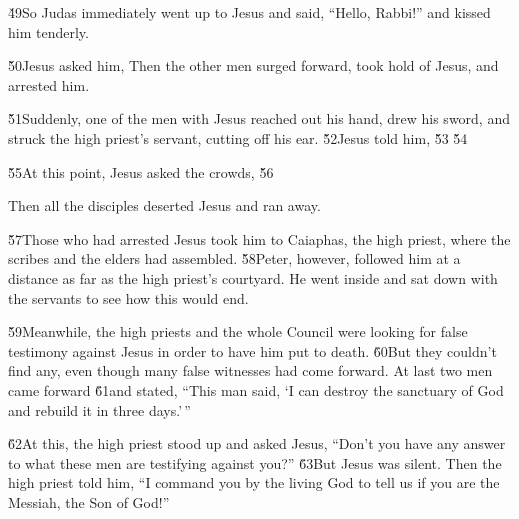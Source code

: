 \v{49}So Judas immediately went up to Jesus and said, ``Hello, Rabbi!'' and kissed him tenderly.

\v{50}Jesus asked him,  Then the other men surged forward, took hold of Jesus, and arrested him.

\v{51}Suddenly, one of the men with Jesus reached out his hand, drew his sword, and struck the high priest's servant, cutting off his ear. \v{52}Jesus told him,  \v{53} \v{54}

\v{55}At this point, Jesus asked the crowds,   \v{56}

Then all the disciples deserted Jesus and ran away.

\v{57}Those who had arrested Jesus took him to Caiaphas, the high priest, where the scribes and the elders had assembled. \v{58}Peter, however, followed him at a distance as far as the high priest's courtyard. He went inside and sat down with the servants to see how this would end.

\v{59}Meanwhile, the high priests and the whole Council were looking for false testimony against Jesus in order to have him put to death. \v{60}But they couldn't find any, even though many false witnesses had come forward. At last two men came forward \v{61}and stated, ``This man said, `I can destroy the sanctuary of God and rebuild it in three days.'\,''

\v{62}At this, the high priest stood up and asked Jesus, ``Don't you have any answer to what these men are testifying against you?'' \v{63}But Jesus was silent. Then the high priest told him, ``I command you by the living God to tell us if you are the Messiah, the Son of God!''

